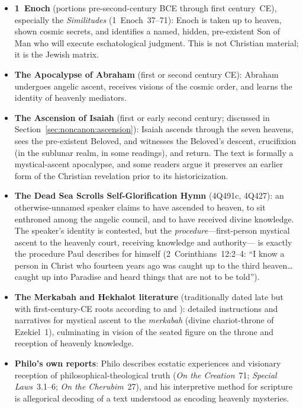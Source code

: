 \documentclass[12pt,oneside]{article}
\begin{document}
\begin{itemize}[leftmargin=2em]
\item \textbf{1~Enoch} (portions pre-second-century BCE through
first century~CE), especially the \textit{Similitudes}
(1~Enoch~37--71): Enoch is taken up to heaven, shown cosmic secrets,
and identifies a named, hidden, pre-existent Son of Man who will
execute eschatological judgment.  This is not Christian material;
it is the Jewish matrix.
\item \textbf{The Apocalypse of Abraham} (first or second century
CE): Abraham undergoes angelic ascent, receives visions of the
cosmic order, and learns the identity of heavenly mediators.
\item \textbf{The Ascension of Isaiah} (first or early second
century; discussed in Section~\ref{sec:noncanon:ascension}): Isaiah
ascends through the seven heavens, sees the pre-existent Beloved,
and witnesses the Beloved's descent, crucifixion (in the sublunar
realm, in some readings), and return.  The text is formally a
mystical-ascent apocalypse, and some readers \citep{Carrier2014}
argue it preserves an earlier form of the Christian revelation
prior to its historicization.
\item \textbf{The Dead Sea Scrolls Self-Glorification Hymn}
(4Q491c, 4Q427): an otherwise-unnamed speaker claims to have
ascended to heaven, to sit enthroned among the angelic council,
and to have received divine knowledge.  The speaker's identity is
contested, but the \textit{procedure}---first-person mystical
ascent to the heavenly court, receiving knowledge and authority---
is exactly the procedure Paul describes for himself
(2~Corinthians~12:2--4: \enquote{I know a person in Christ who
fourteen years ago was caught up to the third heaven\ldots caught
up into Paradise and heard things that are not to be told}).
\item \textbf{The Merkabah and Hekhalot literature} (traditionally
dated late but with first-century-CE roots according to
\citealt{SchaferP2009} and \citealt{Elior2004}): detailed
instructions and narratives for mystical ascent to the
\textit{merkabah} (divine chariot-throne of Ezekiel~1), culminating
in vision of the seated figure on the throne and reception of
heavenly knowledge.
\item \textbf{Philo's own reports}: Philo describes ecstatic
experiences and visionary reception of philosophical-theological
truth (\textit{On the Creation}~71; \textit{Special Laws}~3.1--6;
\textit{On the Cherubim}~27), and his interpretive method for
scripture is allegorical decoding of a text understood as
encoding heavenly mysteries.
\end{itemize}
\end{document}
